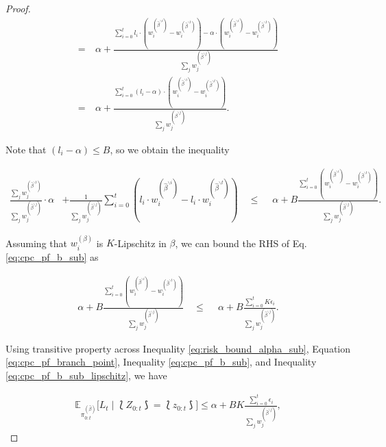 \begin{proof}
\begin{align}
    = & \ \alpha + \frac{\sum_{i=0}^{t}l_i\cdot (w_i^{(\hat\beta^{\backslash i})} - w_i^{(\hat\beta^{\backslash t})}) - \alpha\cdot (w_i^{(\hat\beta^{\backslash i})} -  w_i^{(\hat\beta^{\backslash t})})}{\sum_{j}w_j^{(\hat\beta^{\backslash j})}} \nonumber \\
    = & \ \alpha + \frac{\sum_{i=0}^{t}(l_i - \alpha)\cdot (w_i^{(\hat\beta^{\backslash i})} -  w_i^{(\hat\beta^{\backslash t})})}{\sum_{j}w_j^{(\hat\beta^{\backslash j})}}.
\end{align}



Note that $(l_i - \alpha) \leq B$, so we obtain the inequality

\begin{align}\label{eq:cpc_pf_b_sub}
    \frac{\sum_{j}w_j^{(\hat\beta^{\backslash t})}}{\sum_{j}w_j^{(\hat\beta^{\backslash j})}}\cdot\alpha & +  \frac{1}{\sum_{j}w_j^{(\hat\beta^{\backslash j})}}\sum_{i=0}^{t}(l_i\cdot w_i^{(\hat\beta^{\backslash i})} - l_i\cdot w_i^{(\hat\beta^{\backslash t})}) \quad \leq \quad  \ \alpha + B\frac{\sum_{i=0}^{t}(w_i^{(\hat\beta^{\backslash i})} -  w_i^{(\hat\beta^{\backslash t})})}{\sum_{j}w_j^{(\hat\beta^{\backslash j})}}.
\end{align}

Assuming that $w_i^{(\beta)}$ is $K$-Lipschitz in $\beta$, we can bound the RHS of Eq. \eqref{eq:cpc_pf_b_sub} as

\begin{align}\label{eq:cpc_pf_b_sub_lipschitz}
    \alpha + B\frac{\sum_{i=0}^{t}(w_i^{(\hat\beta^{\backslash i})} -  w_i^{(\hat\beta^{\backslash t})})}{\sum_{j}w_j^{(\hat\beta^{\backslash j})}} \quad \leq \quad  \ \alpha + B\frac{\sum_{i=0}^{t}K\epsilon_i}{\sum_{j}w_j^{(\hat\beta^{\backslash j})}}.
\end{align}

Using transitive property across Inequality \eqref{eq:risk_bound_alpha_sub}, Equation \eqref{eq:cpc_pf_branch_point}, Inequality \eqref{eq:cpc_pf_b_sub}, and Inequality \eqref{eq:cpc_pf_b_sub_lipschitz}, we have

\begin{align*}
    \mathbb{E}_{\pi_{0:t}^{(\hat\beta)}}\Big[L_{t} \mid \lbag Z_{0:t} \rbag = \lbag z_{0:t} \rbag\Big] \leq \alpha + BK\frac{\sum_{i=0}^{t}\epsilon_i}{\sum_{j}w_j^{(\hat\beta^{\backslash j})}},
\end{align*}


\end{proof}
